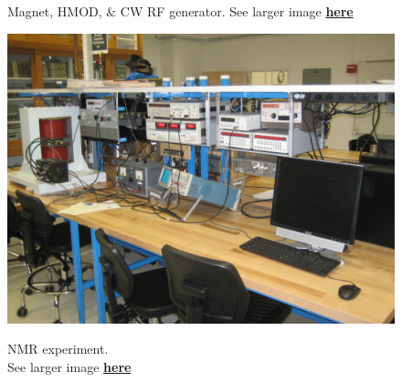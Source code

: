 \documentclass{../lab}
\begin{document}
\begin{figure}[H]
\begin{minipage}{0.32\textwidth}
    \caption{Magnet, HMOD, \& CW RF generator. See larger image \href{http://experimentationlab.berkeley.edu/sites/default/files/images/NMR_Exp_3557.jpg}{\textbf{here}}}
\end{minipage}
\begin{minipage}{0.33\textwidth}
    \href{http://experimentationlab.berkeley.edu/sites/default/files/images/NMR_Exp_3559.jpg}{\includegraphics[width=\linewidth,keepaspectratio]{images/NMR_Exp_3559.jpg}}
    \caption{NMR experiment. \\See larger image \href{http://experimentationlab.berkeley.edu/sites/default/files/images/NMR_Exp_3559.jpg}{\textbf{here}}}
\end{minipage}


\end{figure}
\end{document}
